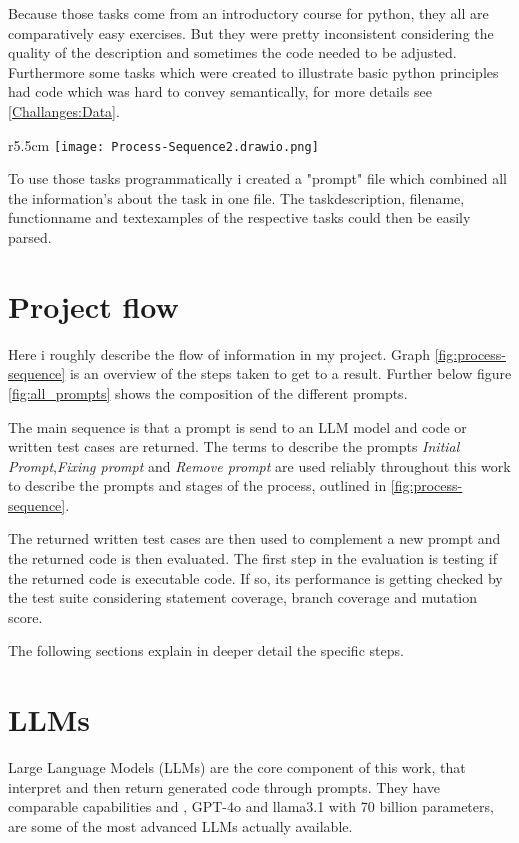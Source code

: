 \documentclass[a4paper,11pt,oneside]{memoir}
\begin{document}
Because those tasks come from an introductory course for python, they all are 	comparatively easy exercises. But they were pretty inconsistent considering the quality of the description and sometimes the code needed to be adjusted.
Furthermore some tasks which were created to illustrate basic python principles had code which was hard to convey semantically, for more details see \ref{Challanges:Data}.

\begin{wrapfigure}[22]{r}{5.5cm}
    \texttt{[image: Process-Sequence2.drawio.png]}
    \caption{Process Sequence}
    \label{fig:process-sequence}
\end{wrapfigure}

To use those tasks programmatically i created a "prompt" file which combined all the information's about the task in one file. The taskdescription, filename, functionname and textexamples of the respective tasks could then be easily parsed. 

\section{Project flow}

Here i roughly describe the flow of information in my project. 
Graph \ref{fig:process-sequence} is an overview of the steps taken to get to a result. Further below figure \ref{fig:all_prompts} shows the composition of the different prompts. 

The main sequence is that a prompt is send to an LLM model and code or written test cases are returned. 
The terms to describe the prompts \textit{Initial Prompt},\textit{Fixing prompt} and \textit{Remove prompt} are used reliably throughout this work to describe the prompts and stages of the process, outlined in \ref{fig:process-sequence}.

The returned written test cases are then used to complement a new prompt and the returned code is then evaluated. The first step in the evaluation is testing if the returned code is executable code. If so, its performance is getting checked by the test suite considering statement coverage, branch coverage and mutation score.  

The following sections explain in deeper detail the specific steps.

\section{LLMs}
Large Language Models (LLMs) are the core component of this work, that interpret and then return generated code through prompts.
They have comparable capabilities and , GPT-4o and llama3.1 with 70 billion parameters, are some of the most advanced LLMs actually available.
\end{document}

